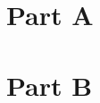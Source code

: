 \documentclass[12pt,twoside]{article}
\begin{document}

\begin{problems}

\section*{Part A}

\problem  %

\begin{problemparts}
\problempart  %
\problempart  %
\problempart  %
\problempart  %
\end{problemparts}

\problem  %

\begin{problemparts}
\problempart
\problempart
\problempart
\problempart
\end{problemparts}

\problem  %
\begin{problemparts}
\problempart
\problempart
\problempart
\problempart
\problempart
\end{problemparts}

\section*{Part B}

\problem  %
\begin{problemparts}
\problempart
\problempart
\problempart
\problempart
\problempart
\end{problemparts}

\end{problems}
\end{document}
